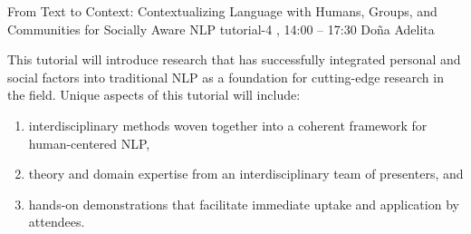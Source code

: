 %

\clearpage
\begin{tutorial}
  {From Text to Context: Contextualizing Language with Humans, Groups, and Communities for Socially Aware NLP}
  {tutorial-4}
  {\daydateyear, 14:00 -- 17:30}
  {Do\~na Adelita}


This tutorial will introduce research that has successfully integrated personal and social factors into traditional NLP as a foundation for cutting-edge research in the field. Unique aspects of this tutorial will include:
\begin{enumerate}
  \item interdisciplinary methods woven together into a coherent framework for human-centered NLP,
  \item theory and domain expertise from an interdisciplinary team of presenters, and
  \item hands-on demonstrations that facilitate immediate uptake and application by attendees.
\end{enumerate}


\end{tutorial}
